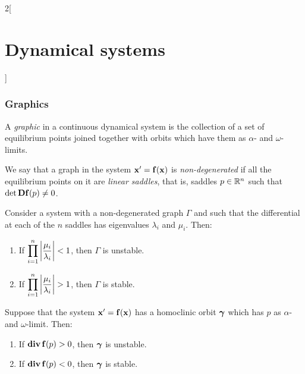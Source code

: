 \documentclass[../../../main_math.tex]{subfiles}
\begin{document}
\begin{multicols}{2}[\section{Dynamical systems}]
  \subsubsection{Graphics}
  \begin{definition}
    A \emph{graphic} in a continuous dynamical system is the collection of a set of equilibrium points joined together with orbits which have them as $\alpha$- and $\omega$-limits.
  \end{definition}
  \begin{definition}
    We say that a graph in the system $\boldsymbol{\mathrm{x}}'=\boldsymbol{\mathrm{f}}(\boldsymbol{\mathrm{x}})$ is \emph{non-degenerated} if all the equilibrium points on it are \emph{linear saddles}, that is, saddles $p\in\mathbb{R}^n$ such that $\det\boldsymbol{\mathrm{Df}}(p)\ne 0$.
  \end{definition}
  \begin{proposition}
    Consider a system with a non-degenerated graph $\Gamma$ and such that the differential at each of the $n$ saddles has eigenvalues $\lambda_i$ and $\mu_i$. Then:
    \begin{enumerate}
      \item If $\displaystyle\prod_{i=1}^n\abs{\frac{\mu_i}{\lambda_i}}<1$, then $\Gamma$ is unstable.
      \item If $\displaystyle\prod_{i=1}^n\abs{\frac{\mu_i}{\lambda_i}}>1$, then $\Gamma$ is stable.
    \end{enumerate}
  \end{proposition}
  \begin{corollary}
    Suppose that the system $\boldsymbol{\mathrm{x}}'=\boldsymbol{\mathrm{f}}(\boldsymbol{\mathrm{x}})$ has a homoclinic orbit $\boldsymbol{\mathrm{\gamma}}$ which has $p$ as $\alpha$- and $\omega$-limit. Then:
    \begin{enumerate}
      \item If $\operatorname{\boldsymbol{\mathrm{div}}} \boldsymbol{\mathrm{f}}(p)>0$, then $\boldsymbol{\mathrm{\gamma}}$ is unstable.
      \item If $\operatorname{\boldsymbol{\mathrm{div}}} \boldsymbol{\mathrm{f}}(p)<0$, then $\boldsymbol{\mathrm{\gamma}}$ is stable.
    \end{enumerate}
  \end{corollary}

\end{multicols}
\end{document}
